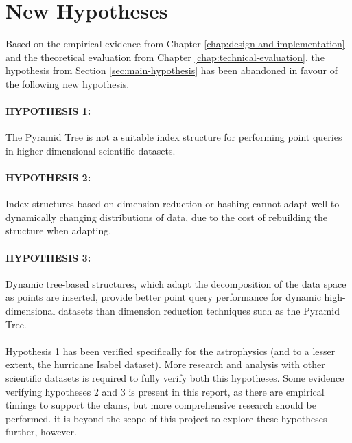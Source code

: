 \section{New Hypotheses}

Based on the empirical evidence from Chapter \ref{chap:design-and-implementation} and the theoretical evaluation from Chapter \ref{chap:technical-evaluation}, the hypothesis from Section \ref{sec:main-hypothesis} has been abandoned in favour of the following new hypothesis.

\paragraph{\textbf{HYPOTHESIS 1:}} The Pyramid Tree is not a suitable index structure for performing point queries in higher-dimensional scientific datasets.

\paragraph{\textbf{HYPOTHESIS 2:}} Index structures based on dimension reduction or hashing cannot adapt well to dynamically changing distributions of data, due to the cost of rebuilding the structure when adapting.

\paragraph{\textbf{HYPOTHESIS 3:}} Dynamic tree-based structures, which adapt the decomposition of the data space as points are inserted, provide better point query performance for dynamic high-dimensional datasets than dimension reduction techniques such as the Pyramid Tree.

\paragraph{}

Hypothesis 1 has been verified specifically for the astrophysics (and to a lesser extent, the hurricane Isabel dataset). More research and analysis with other scientific datasets is required to fully verify both this hypotheses. Some evidence verifying hypotheses 2 and 3 is present in this report, as there are empirical timings to support the clams, but more comprehensive research should be performed. it is beyond the scope of this project to explore these hypotheses further, however.